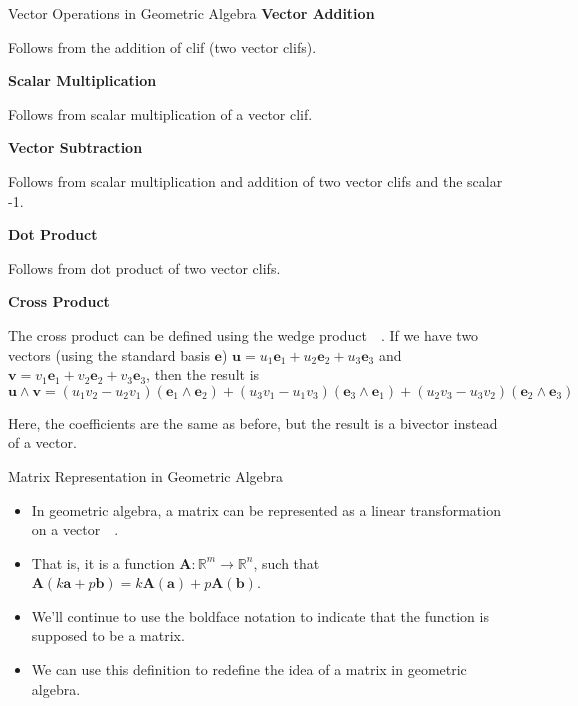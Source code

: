 \documentclass[aspectratio=169,xcolor=dvipsnames]{beamer}
\begin{document}
\begin{frame}{Vector Operations in Geometric Algebra}
      \noindent\textbf{Vector Addition}

      Follows from the addition of clif (two vector clifs).
      
      \noindent\textbf{Scalar Multiplication}

      Follows from scalar multiplication of a vector clif.
      
      \noindent\textbf{Vector Subtraction}

      Follows from scalar multiplication and addition of two vector clifs and 
      the scalar -1.
      
      \noindent\textbf{Dot Product}

      Follows from dot product of two vector clifs.

      \noindent \textbf{Cross Product}
      
      The cross product can be defined using the wedge product~{\color{red}~\cite{enwiki:1272926547}}.
      If we have two vectors (using the standard basis $\textbf{e}$) $\mathbf{u}= u_1\mathbf e_1+u_2\mathbf e_2+u_3\mathbf e_3$ 
      and $\mathbf{v} = v_1\mathbf e_1+v_2\mathbf e_2+v_3\mathbf e_3$,
      then the result is
      $$\mathbf u \land \mathbf v = (u_1v_2 - u_2v_1)(\mathbf e_1 \land \mathbf e_2)+
      (u_3v_1 - u_1v_3)(\mathbf e_3 \land \mathbf e_1)+
      (u_2v_3 - u_3v_2)(\mathbf e_2 \land \mathbf e_3)$$

      Here, the coefficients are the same as before, but the result is a bivector
      instead of a vector.

\end{frame}


\begin{frame}{Matrix Representation in Geometric Algebra}
      \begin{itemize}
            \item In geometric algebra, a matrix can be represented as a linear transformation on 
            a vector~{\color{red}~\cite{Mathoma2019}}.
            \item That is, it is a function $\mathbf A : \mathbb{R}^m \to \mathbb{R}^n$, such that $\mathbf A(k\mathbf a + p\mathbf b)
                  = k\mathbf A(\mathbf a) + p\mathbf A(\mathbf b)$.
            \item We'll continue to use the boldface notation to indicate that the
                  function is supposed to be a matrix.
            \item We can use this definition to redefine the idea of a matrix
                  in geometric algebra.
      \end{itemize}
\end{frame}
\end{document}
